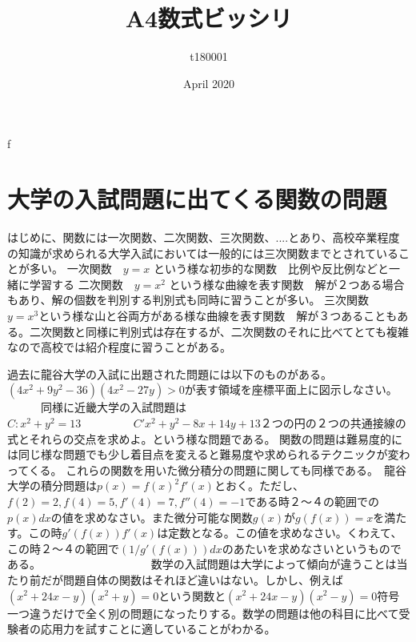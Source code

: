 f\documentclass{article}
\title{A4数式ビッシリ}
\author{t180001 }
\date{April 2020}
\begin{document}
\maketitle

\section{大学の入試問題に出てくる関数の問題}
はじめに、関数には一次関数、二次関数、三次関数、....とあり、高校卒業程度の知識が求められる大学入試においては一般的には三次関数までとされていることが多い。
一次関数　$y=x$ という様な初歩的な関数　比例や反比例などと一緒に学習する
二次関数　$y=x^2$  という様な曲線を表す関数　解が２つある場合もあり、解の個数を判別する判別式も同時に習うことが多い。
三次関数　$y=x^3$という様な山と谷両方がある様な曲線を表す関数　解が３つあることもある。二次関数と同様に判別式は存在するが、二次関数のそれに比べてとても複雑なので高校では紹介程度に習うことがある。　

過去に龍谷大学の入試に出題された問題には以下のものがある。　　　　　$(4x^2+9y^2-36)(4x^2-27y)>0$が表す領域を座標平面上に図示しなさい。
　　　同様に近畿大学の入試問題は　　　　　　　　　　　　　　　　　　　　　　$C:x^2+y^2=13$   　　　　  $   C'x^2+y^2-8x+14y+13$２つの円の２つの共通接線の式とそれらの交点を求めよ。という様な問題である。
   関数の問題は難易度的には同じ様な問題でも少し着目点を変えると難易度や求められるテクニックが変わってくる。
   これらの関数を用いた微分積分の問題に関しても同様である。　龍谷大学の積分問題は$p(x)={f(x)}^2f'(x)$とおく。ただし、$f(2)=2,f(4)=5,f'(4)=7,f''(4)=-1$である時２〜４の範囲での$p(x)dx$の値を求めなさい。また微分可能な関数$g(x)$が$g(f(x))=x$を満たす。この時$g'(f(x))f'(x)$は定数となる。この値を求めなさい。くわえて、この時２〜４の範囲で$(1/g'(f(x)))dx$のあたいを求めなさいというものである。　　　　　　　　　　
数学の入試問題は大学によって傾向が違うことは当たり前だが問題自体の関数はそれほど違いはない。しかし、例えば$(x^2+24x-y)(x^2+y)=0$という関数と$(x^2+24x-y)(x^2-y)=0$符号一つ違うだけで全く別の問題になったりする。数学の問題は他の科目に比べて受験者の応用力を試すことに適していることがわかる。 
\end{document}
